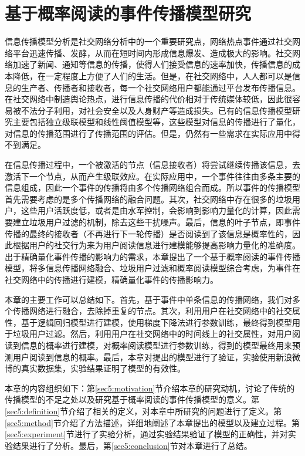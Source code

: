 \chapter{基于概率阅读的事件传播模型研究}
\label{chap5:main}
信息传播模型分析是社交网络分析中的一个重要研究点，网络热点事件通过社交网络平台迅速传播、发酵，从而在短时间内形成信息爆发、造成极大的影响。社交网络加速了新闻、通知等信息的传播，使得人们接受信息的速率加快，传播信息的成本降低，在一定程度上方便了人们的生活。但是，在社交网络中，人人都可以是信息的生产者、传播者和接收者，每一个社交网络用户都能通过平台发布传播信息。在社交网络中制造舆论热点，进行信息传播的代价相对于传统媒体较低，因此很容易被不法分子利用，对社会安全以及人身财产等造成损失。已有的信息传播模型研究主要包括独立级联模型和线性阈值模型等，这些模型对信息的传播进行了量化，对信息的传播范围进行了传播范围的评估。但是，仍然有一些需求在实际应用中得不到满足。

在信息传播过程中，一个被激活的节点（信息接收者）将尝试继续传播该信息，去激活下一个节点，从而产生级联效应。在实际应用中，一个事件往往由多条主要的信息组成，因此一个事件的传播将由多个传播网络组合而成。所以事件的传播模型首先需要考虑的是多个传播网络的融合问题。其次，社交网络中存在很多的垃圾用户，这些用户活跃度低，或者是由水军控制，会影响到影响力量化的计算，因此需要建立垃圾用户过滤的机制，除去这些干扰噪声。最后，信息的叶子节点，即事件传播的最终的接收者（不再进行下一轮传播）是否阅读到了该信息是概率性的，因此根据用户的社交行为来为用户阅读信息进行建模能够提高影响力量化的准确度。出于精确量化事件传播的影响力的需求，本章提出了一个基于概率阅读的事件传播模型，将多信息传播网络融合、垃圾用户过滤和概率阅读模型综合考虑，为事件在社交网络中的传播进行建模，精确量化事件的传播影响力。

本章的主要工作可以总结如下。首先，基于事件中单条信息的传播网络，我们对多个传播网络进行融合，去除掉重复的节点。其次，利用用户在社交网络中的社交属性，基于逻辑回归模型进行建模，使用梯度下降法进行参数训练，最终得到模型用于垃圾用户过滤。然后，利用用户在社交网络中的时间线上的社交属性，对用户阅读到信息的概率进行建模，对概率阅读模型进行参数训练，得到的模型最终用来预测用户阅读到信息的概率。最后，本章对提出的模型进行了验证，实验使用新浪微博的真实数据集，实验结果证明了模型的有效性。

本章的内容组织如下：第\ref{sec5:motivation}节介绍本章的研究动机，讨论了传统的传播模型的不足之处以及研究基于概率阅读的事件传播模型的意义。第\ref{sec5:definition}节介绍了相关的定义，对本章中所研究的问题进行了定义。第\ref{sec5:method}节介绍了方法描述，详细地阐述了本章提出的模型以及建立过程。第\ref{sec5:experiment}节进行了实验分析，通过实验结果验证了模型的正确性，并对实验结果进行了分析。最后，第\ref{sec5:conclusion}节对本章进行了总结。
